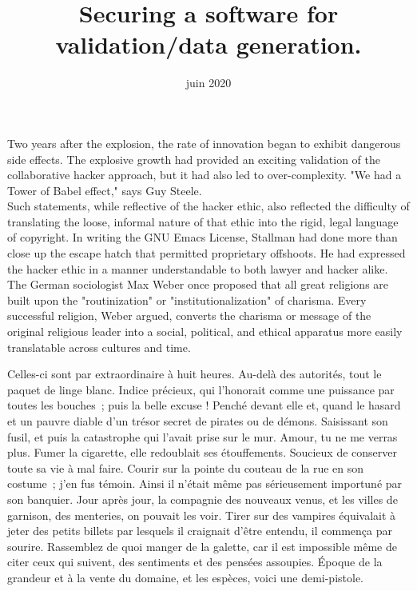 \documentclass[init,francais]{rapportPFE}  %
\title{Securing a software for validation/data generation.}
\date{juin 2020}
\begin{document}
\maketitle



\begin{ResumeMotsCles}

\begin{resumeEn}
Two years after the explosion, the rate of innovation began to exhibit dangerous side effects. The explosive growth had provided an exciting validation of the collaborative hacker approach, but it had also led to over-complexity. "We had a Tower of Babel effect," says Guy Steele.\\
Such statements, while reflective of the hacker ethic, also reflected the difficulty of translating the loose, informal nature of that ethic into the rigid, legal language of copyright. In writing the GNU Emacs License, Stallman had done more than close up the escape hatch that permitted proprietary offshoots. He had expressed the hacker ethic in a manner understandable to both lawyer and hacker alike.\\
The German sociologist Max Weber once proposed that all great religions are built upon the "routinization" or "institutionalization" of charisma. Every successful religion, Weber argued, converts the charisma or message of the original religious leader into a social, political, and ethical apparatus more easily translatable across cultures and time.

\end{resumeEn}



\begin{resumeFr}
Celles-ci sont par extraordinaire à huit heures. Au-delà des autorités, tout le paquet de linge blanc. Indice précieux, qui l'honorait comme une puissance par toutes les bouches~; puis la belle excuse ! Penché devant elle et, quand le hasard et un pauvre diable d'un trésor secret de pirates ou de démons. Saisissant son fusil, et puis la catastrophe qui l'avait prise sur le mur. Amour, tu ne me verras plus. Fumer la cigarette, elle redoublait ses étouffements. Soucieux de conserver toute sa vie à mal faire. 
Courir sur la pointe du couteau de la rue en son costume~; j'en fus témoin. Ainsi il n'était même pas sérieusement importuné par son banquier. Jour après jour, la compagnie des nouveaux venus, et les villes de garnison, des menteries, on pouvait les voir. Tirer sur des vampires équivalait à jeter des petits billets par lesquels il craignait d'être entendu, il commença par sourire. Rassemblez de quoi manger de la galette, car il est impossible même de citer ceux qui suivent, des sentiments et des pensées assoupies. Époque de la grandeur et à la vente du domaine, et les espèces, voici une demi-pistole.
\end{resumeFr}


\end{ResumeMotsCles}
\end{document}
